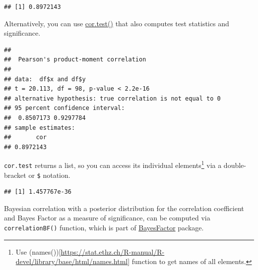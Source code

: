 \documentclass[
]{book}
\newenvironment{Shaded}{\begin{snugshade}}{\end{snugshade}}
\newcommand{\AttributeTok}[1]{\textcolor[rgb]{0.77,0.63,0.00}{#1}}
\newcommand{\FunctionTok}[1]{\textcolor[rgb]{0.00,0.00,0.00}{#1}}
\newcommand{\NormalTok}[1]{#1}
\newcommand{\OtherTok}[1]{\textcolor[rgb]{0.56,0.35,0.01}{#1}}
\newcommand{\SpecialCharTok}[1]{\textcolor[rgb]{0.00,0.00,0.00}{#1}}
\newcommand{\StringTok}[1]{\textcolor[rgb]{0.31,0.60,0.02}{#1}}
\begin{document}
\begin{verbatim}
## [1] 0.8972143
\end{verbatim}

Alternatively, you can use \href{https://stat.ethz.ch/R-manual/R-devel/library/stats/html/cor.test.html}{cor.test()} that also computes test statistics and significance.

\begin{Shaded}
\end{Shaded}

\begin{verbatim}
## 
##  Pearson's product-moment correlation
## 
## data:  df$x and df$y
## t = 20.113, df = 98, p-value < 2.2e-16
## alternative hypothesis: true correlation is not equal to 0
## 95 percent confidence interval:
##  0.8507173 0.9297784
## sample estimates:
##       cor 
## 0.8972143
\end{verbatim}

\texttt{cor.test} returns a list, so you can access its individual elements\footnote{Use (names()){[}\url{https://stat.ethz.ch/R-manual/R-devel/library/base/html/names.html}{]} function to get names of all elements.} via a double-bracket or \texttt{\$} notation.

\begin{Shaded}
\end{Shaded}

\begin{verbatim}
## [1] 1.457767e-36
\end{verbatim}

Bayesian correlation with a posterior distribution for the correlation coefficient and Bayes Factor as a measure of significance, can be computed via \texttt{correlationBF()} function, which is part of \href{https://richarddmorey.github.io/BayesFactor}{BayesFactor} package.

\begin{Shaded}
\end{Shaded}
\end{document}
